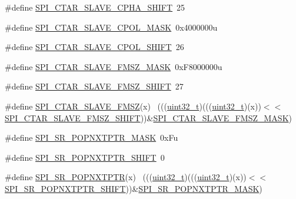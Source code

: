 \begin{DoxyCompactItemize}
\#define \hyperlink{group___s_p_i___register___masks_ga6470631f0d2f0d7722ab55a1f97c936e}{S\+P\+I\+\_\+\+C\+T\+A\+R\+\_\+\+S\+L\+A\+V\+E\+\_\+\+C\+P\+H\+A\+\_\+\+S\+H\+I\+FT}~25
\item 
\#define \hyperlink{group___s_p_i___register___masks_ga57c0bdc9ff5183b0e8da776a8d803ff1}{S\+P\+I\+\_\+\+C\+T\+A\+R\+\_\+\+S\+L\+A\+V\+E\+\_\+\+C\+P\+O\+L\+\_\+\+M\+A\+SK}~0x4000000u
\item 
\#define \hyperlink{group___s_p_i___register___masks_ga183134048ae879b82e3aa07b4a51d79d}{S\+P\+I\+\_\+\+C\+T\+A\+R\+\_\+\+S\+L\+A\+V\+E\+\_\+\+C\+P\+O\+L\+\_\+\+S\+H\+I\+FT}~26
\item 
\#define \hyperlink{group___s_p_i___register___masks_ga5230074b3809e2ef525e87fdca078717}{S\+P\+I\+\_\+\+C\+T\+A\+R\+\_\+\+S\+L\+A\+V\+E\+\_\+\+F\+M\+S\+Z\+\_\+\+M\+A\+SK}~0x\+F8000000u
\item 
\#define \hyperlink{group___s_p_i___register___masks_gaf8ee524100dedae1cc3afb60643b2475}{S\+P\+I\+\_\+\+C\+T\+A\+R\+\_\+\+S\+L\+A\+V\+E\+\_\+\+F\+M\+S\+Z\+\_\+\+S\+H\+I\+FT}~27
\item 
\#define \hyperlink{group___s_p_i___register___masks_ga5f6b2041d6342e35e47e90bffa08a0e0}{S\+P\+I\+\_\+\+C\+T\+A\+R\+\_\+\+S\+L\+A\+V\+E\+\_\+\+F\+M\+SZ}(x)                                  ~(((\hyperlink{_p_e___types_8h_a33594304e786b158f3fb30289278f5af}{uint32\+\_\+t})(((\hyperlink{_p_e___types_8h_a33594304e786b158f3fb30289278f5af}{uint32\+\_\+t})(x))$<$$<$\hyperlink{group___s_p_i___register___masks_gaf8ee524100dedae1cc3afb60643b2475}{S\+P\+I\+\_\+\+C\+T\+A\+R\+\_\+\+S\+L\+A\+V\+E\+\_\+\+F\+M\+S\+Z\+\_\+\+S\+H\+I\+FT}))\&\hyperlink{group___s_p_i___register___masks_ga5230074b3809e2ef525e87fdca078717}{S\+P\+I\+\_\+\+C\+T\+A\+R\+\_\+\+S\+L\+A\+V\+E\+\_\+\+F\+M\+S\+Z\+\_\+\+M\+A\+SK})
\item 
\#define \hyperlink{group___s_p_i___register___masks_gabf0bcd5a32bcc6e58bac1a0f826ab3c6}{S\+P\+I\+\_\+\+S\+R\+\_\+\+P\+O\+P\+N\+X\+T\+P\+T\+R\+\_\+\+M\+A\+SK}~0x\+Fu
\item 
\#define \hyperlink{group___s_p_i___register___masks_gac1f2a81bf6d8b44020db098097c74964}{S\+P\+I\+\_\+\+S\+R\+\_\+\+P\+O\+P\+N\+X\+T\+P\+T\+R\+\_\+\+S\+H\+I\+FT}~0
\item 
\#define \hyperlink{group___s_p_i___register___masks_ga9e1c7085f14a2aab9d3585f3a81cb618}{S\+P\+I\+\_\+\+S\+R\+\_\+\+P\+O\+P\+N\+X\+T\+P\+TR}(x)                                        ~(((\hyperlink{_p_e___types_8h_a33594304e786b158f3fb30289278f5af}{uint32\+\_\+t})(((\hyperlink{_p_e___types_8h_a33594304e786b158f3fb30289278f5af}{uint32\+\_\+t})(x))$<$$<$\hyperlink{group___s_p_i___register___masks_gac1f2a81bf6d8b44020db098097c74964}{S\+P\+I\+\_\+\+S\+R\+\_\+\+P\+O\+P\+N\+X\+T\+P\+T\+R\+\_\+\+S\+H\+I\+FT}))\&\hyperlink{group___s_p_i___register___masks_gabf0bcd5a32bcc6e58bac1a0f826ab3c6}{S\+P\+I\+\_\+\+S\+R\+\_\+\+P\+O\+P\+N\+X\+T\+P\+T\+R\+\_\+\+M\+A\+SK})

\end{DoxyCompactItemize}
